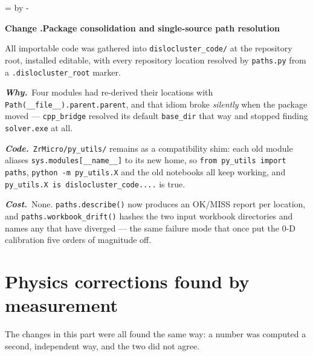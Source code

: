 \documentclass[11pt,a4paper]{article}
\newcommand{\code}[1]{\texttt{\small #1}}
\newcommand{\needlines}[1]{%
  \par\dimen0=\pagegoal \advance\dimen0 by -\pagetotal
  \ifdim\dimen0<#1\baselineskip \newpage \fi}
\newcounter{chg}
\newcommand{\change}[1]{%
  \needlines{4}%
  \refstepcounter{chg}%
  \par\medskip\noindent
  {\bfseries\boldmath Change \thechg.\quad #1}%
  \par\nobreak\smallskip}
\newcommand{\why}[1]{\par\noindent\textbf{\itshape Why.}\ #1\par}
\newcommand{\impact}[1]{\par\noindent\textbf{\itshape Code.}\ #1\par}
\newcommand{\cost}[1]{\par\noindent\textbf{\itshape Cost.}\ #1\par}
\begin{document}
\change{Package consolidation and single-source path resolution}
\label{chg:paths}
All importable code was gathered into \code{dislocluster\_code/} at the
repository root, installed editable, with every repository location resolved by
\code{paths.py} from a \code{.dislocluster\_root} marker.
\why{Four modules had re-derived their locations with
\code{Path(\_\_file\_\_).parent.parent}, and that idiom broke \emph{silently}
when the package moved --- \code{cpp\_bridge} resolved its default
\code{base\_dir} that way and stopped finding \code{solver.exe} at all.}
\impact{\code{ZrMicro/py\_utils/} remains as a compatibility shim: each old
module aliases \code{sys.modules[\_\_name\_\_]} to its new home, so
\code{from py\_utils import paths}, \code{python -m py\_utils.X} and the old
notebooks all keep working, and \code{py\_utils.X is dislocluster\_code....}
is true.}
\cost{None. \code{paths.describe()} now produces an OK/MISS report per
location, and \code{paths.workbook\_drift()} hashes the two input workbook
directories and names any that have diverged --- the same failure mode that
once put the 0-D calibration five orders of magnitude off.}

\part{Physics corrections found by measurement}
\label{part:physics}

The changes in this part were all found the same way: a number was computed a
second, independent way, and the two did not agree.
\end{document}
